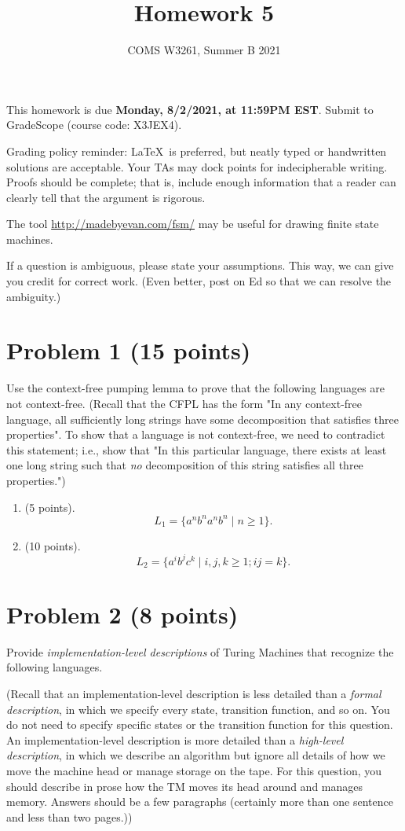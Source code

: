 \documentclass[letterpaper,11pt,twoside]{article}
\title{Homework 5}
\date{COMS W3261, Summer B 2021}
\theoremstyle{plain}
\theoremstyle{definition}
\theoremstyle{remark}
\theoremstyle{restate}
\begin{document}
\maketitle

This homework is due \textbf{Monday, 8/2/2021, at 11:59PM EST}. Submit to GradeScope (course code: X3JEX4).

Grading policy reminder: \LaTeX~is preferred, but neatly typed or handwritten solutions are acceptable. Your TAs may dock points for indecipherable writing. Proofs should be complete; that is, include enough information that a reader can clearly tell that the argument is rigorous.

The tool \url{http://madebyevan.com/fsm/} may be useful for drawing finite state machines.

If a question is ambiguous, please state your assumptions. This way, we can give you credit for correct work. (Even better, post on Ed so that we can resolve the ambiguity.)

\clearpage
\section{Problem 1 (15 points)}

Use the context-free pumping lemma to prove that the following languages are not context-free. (Recall that the CFPL has the form "In any context-free language, all sufficiently long strings have some decomposition that satisfies three properties". To show that a language is not context-free, we need to contradict this statement; i.e., show that "In this particular language, there exists at least one long string such that \emph{no} decomposition of this string satisfies all three properties.")
\begin{enumerate}
    \item (5 points).
    \[
        L_1 = \{a^nb^na^nb^n \; | \; n \geq 1\}.
    \]
    
    \item (10 points).
    \[
        L_2 = \{a^ib^jc^k \; | \; i, j, k \geq 1; ij = k\}.
    \]
\end{enumerate}

\clearpage
\section{Problem 2 (8 points)}
Provide \emph{implementation-level descriptions} of Turing Machines that recognize the following languages.

(Recall that an implementation-level description is less detailed than a \emph{formal description}, in which we specify every state, transition function, and so on. You do not need to specify specific states or the transition function for this question. An implementation-level description is more detailed than a \emph{high-level description}, in which we describe an algorithm but ignore all details of how we move the machine head or manage storage on the tape. For this question, you should describe in prose how the TM moves its head around and manages memory. Answers should be a few paragraphs (certainly more than one sentence and less than two pages.))
\end{document}
